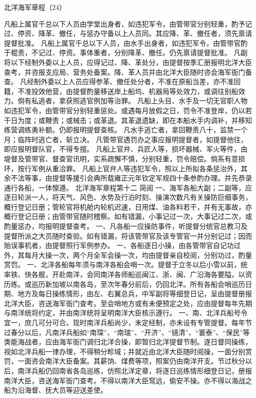 \documentclass[12pt,UTF8]{ctexbook}
\begin{document}
北洋海军章程（24）

凡船上属官千总以下人员由学堂出身者，如违犯军令，由管带官分别轻重，酌予记过、停资、降革、撤任，与惩办守备以上人员同。其应降、革、撤任者，须先禀请提督批准。
凡船上属官千总以下人员，由水手出身者，如违犯军令，由管带官酌于棍责，不记过、停资。事体重者，分别降革、撤任。仍先禀请提督批准。
凡副将以下经制外委以上人员，应得记过、降、革处分，由提督按季汇册报明北洋大臣查考，并咨报支应局、营务处备案。降、革人员并由北洋大臣随时咨会海军衙门备查。
凡经制外委以上人员应得参革、撤任处分者，不准在原船当差，亦不准回籍，不准投效他营，由提督酌量移送岸上船坞、机器局等处效力，或调往别船效力。倘有私逃者，拿获照逃官例加等治罪。
凡船上头目、水手及一切无官职人物如违犯军令，由管带官分别轻重惩处。或遇每月放假之日，罚令不准登岸，仍以若干日为度；或鞭责；或械击；或革退。其革退遗缺，即在本船水手内调补，并移知练营调练勇补额。仍即报明提督查核。
凡水手逃亡者，拿回鞭责八十，监禁一个月；临阵时逃亡者，斩立决。
凡管带官遇罚办之事应报明提督者，如提督他往，即应报明督队官，不得专擅。
凡船上官弁、兵匠人等，损坏器械、军火等件，由堤督及管带官、督查官讯明，实系疏懈不慎，分别轻重，罚令赔偿。倘系有意损环，按行军例从重洽罪。
凡船上官弁人等违犯军令，照以上所拟各条惩治外，其余不法等事，由提督等援引会典所载雍正元年钦定军规四十条参酌办理。并先恭录通行各船，一体懔遵。
北洋海军章程第十二
简阅
一、海军各船大副；二副等，应逐日轮派一人，将天气、风色、水势及行泊时刻、操演次数凡有关操防巨细事务，概行登记日册；管轮官将机舱内轮机迟速，日用煤、油各料若干，并有无事故，亦概行登记日册；由管带官随时稽察。如有错漏，小事记过一次，大事记过二次，或酌量惩办，均报明提督查考。
一、凡各船一应操防事件，听提督分统官总教习及提督所派之大员随时查验。如有错漏，将该管带官及该专管官一并分别记过；因而贻误事机者，由提督照行军例参办。
一、各船逐日小操，由各管带官自记功过外，其每月大操一次，两个月全军会操一次，均由提督亲自校阅，分别功过，酌量赏罚。
一、北洋各船每年须与南洋各船会哨一次。提督于立冬以后小雪以前，统率铁、快各舰，开赴南洋，会同南洋各师船巡闽江、浙、闽、广沿海各要隘，以资历练。或巡历新加坡以南各岛，至次年春分前后，仍回北洋。所有各船会哨巡历日期、地方及每日操练情形，由左、右翼总兵，中军副将等细登日记，呈由提督册报北洋大臣，咨送海军衙门查考。至会哨地方或有未便预定之处，应由提督每年先期与南洋统将约定，并由南洋统将呈明南洋大臣核示遵行。
一、南、北洋兵船号令宜一，庶几可分可合。现时南洋兵船尚少，未定经制，亦未设有专管提督。每年节过春分以后，凡南洋兵船如“南琛”、“南瑞”、“开济”、“镜清”、“寰泰”、“保民”等类能海战者，应由海军衙门调归北洋合操，即暂归北洋提督节制。逐日督同操练，视如北洋兵船一律办理，不得稍分畛域；并就近由北洋大臣随时阅操，一面分别赏罚，一面咨会南洋大臣备案。其薪饷、煤费等项，照案仍由南洋开支。节过秋分以后，南洋兵船仍回南省各岛巡练，仿照北洋定章，将逐日巡练情形细登日记，册报南洋大臣，咨送海军衙门查考。不得以南洋大臣窎远，偷安不操。亦不得以海战之船为沿海督、抚大员等迎送差使。
\end{document}
